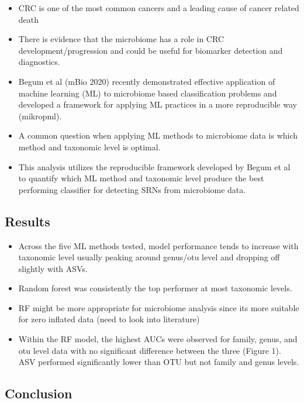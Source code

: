 \documentclass[]{article}
\begin{document}
\begin{itemize}
\itemsep1pt\parskip0pt
\item
  CRC is one of the most common cancers and a leading cause of cancer
  related death
\item
  There is evidence that the microbiome has a role in CRC
  development/progression and could be useful for biomarker detection
  and diagnostics.
\item
  Begum et al (mBio 2020) recently demonstrated effective application of
  machine learning (ML) to microbiome based classification problems and
  developed a framework for applying ML practices in a more reproducible
  way (mikropml).
\item
  A common question when applying ML methods to microbiome data is which
  method and taxonomic level is optimal.
\item
  This analysis utilizes the reproducible framework developed by Begum
  et al to quantify which ML method and taxonomic level produce the best
  performing classifier for detecting SRNs from microbiome data.
\end{itemize}

\newpage

\subsection{Results}\label{results}

\begin{itemize}
\itemsep1pt\parskip0pt
\item
  Across the five ML methods tested, model performance tends to increase
  with taxonomic level usually peaking around genus/otu level and
  dropping off slightly with ASVs.
\item
  Random forest was consistently the top performer at most taxonomic
  levels.
\item
  RF might be more appropriate for microbiome analysis since its more
  suitable for zero inflated data (need to look into literature)
\item
  Within the RF model, the highest AUCs were observed for family, genus,
  and otu level data with no significant difference between the three
  (Figure 1). ASV performed significantly lower than OTU but not family
  and genus levels.
\end{itemize}

\newpage

\subsection{Conclusion}\label{conclusion}
\end{document}
